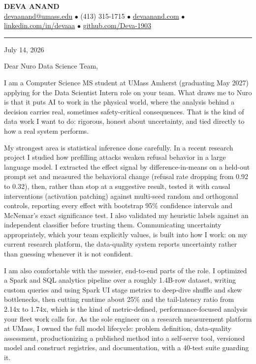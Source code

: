 \documentclass[letterpaper,11pt]{article}
\begin{document}
\begin{center}
    {\fontsize{18}{20}\selectfont\bfseries DEVA ANAND}\\ \vspace{3pt}
    {\small
    \href{mailto:devaanand@umass.edu}{devaanand@umass.edu}
    \enspace$\bullet$\enspace
    (413) 315-1715
    \enspace$\bullet$\enspace
    \href{https://devaanand.com}{devaanand.com}
    \enspace$\bullet$\enspace
    \href{https://linkedin.com/in/devaaa/}{linkedin.com/in/devaaa}
    \enspace$\bullet$\enspace
    \href{https://github.com/Deva-1903}{github.com/Deva-1903}}
\end{center}
\vspace{6pt}
\hrule
\vspace{10pt}

July 14, 2026

\vspace{2pt}

Dear Nuro Data Science Team,

I am a Computer Science MS student at UMass Amherst (graduating May 2027) applying for the Data Scientist Intern role on your team. What draws me to Nuro is that it puts AI to work in the physical world, where the analysis behind a decision carries real, sometimes safety-critical consequences. That is the kind of data work I want to do: rigorous, honest about uncertainty, and tied directly to how a real system performs.

My strongest area is statistical inference done carefully. In a recent research project I studied how prefilling attacks weaken refusal behavior in a large language model. I extracted the effect signal by difference-in-means on a held-out prompt set and measured the behavioral change (refusal rate dropping from 0.92 to 0.32), then, rather than stop at a suggestive result, tested it with causal interventions (activation patching) against multi-seed random and orthogonal controls, reporting every effect with bootstrap 95\% confidence intervals and McNemar's exact significance test. I also validated my heuristic labels against an independent classifier before trusting them. Communicating uncertainty appropriately, which your team explicitly values, is built into how I work: on my current research platform, the data-quality system reports uncertainty rather than guessing whenever it is not confident.

I am also comfortable with the messier, end-to-end parts of the role. I optimized a Spark and SQL analytics pipeline over a roughly 1.4B-row dataset, writing custom queries and using Spark UI stage metrics to deep-dive shuffle and skew bottlenecks, then cutting runtime about 25\% and the tail-latency ratio from 2.14x to 1.74x, which is the kind of metric-defined, performance-focused analysis your fleet work calls for. As the sole engineer on a research measurement platform at UMass, I owned the full model lifecycle: problem definition, data-quality assessment, productionizing a published method into a self-serve tool, versioned model and construct registries, and documentation, with a 40-test suite guarding it.
\end{document}
